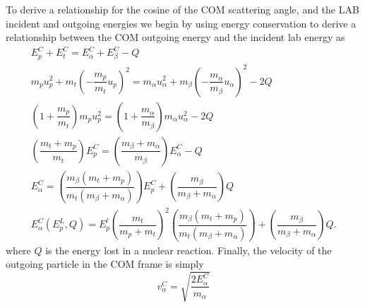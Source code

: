 \documentclass[../main.tex]{subfiles}
\begin{document}
To derive a relationship for the cosine of the COM scattering angle, and the LAB incident and outgoing energies we begin by using energy conservation to derive a relationship between the COM outgoing energy and the incident lab energy as
\begin{gather*}
  E_p^C + E_t^C = E_{\alpha}^C + E_{\beta}^C - Q \\
  m_p u_p^2 + m_t \left(-\dfrac{m_p}{m_t} u_p \right)^2 = m_{\alpha} u_{\alpha}^2 + m_{\beta} \left(-\dfrac{m_{\alpha}}{m_{\beta}} u_{\alpha}\right)^2 - 2 Q \\
  \left(1 + \dfrac{m_p}{m_t}\right) m_p u_p^2 = \left(1 + \dfrac{m_{\alpha}}{m_{\beta}}\right) m_{\alpha} u_{\alpha}^2 - 2Q \\
  \left(\dfrac{m_t + m_p}{m_t}\right) E_p^C = \left(\dfrac{m_{\beta} + m_{\alpha}}{m_{\beta}}\right) E_{\alpha}^C - Q \\
  E_{\alpha}^C = \left(\dfrac{m_{\beta}(m_t + m_p)}{m_t(m_{\beta}+m_{\alpha})}\right) E_p^C + \left(\dfrac{m_{\beta}}{m_{\beta}+m_{\alpha}}\right) Q \\
  \boxed{E_{\alpha}^C(E_p^L,Q) = E_p^l \left( \dfrac{m_t}{m_p+m_t} \right)^2 \left(\dfrac{m_{\beta}(m_t + m_p)}{m_t(m_{\beta}+m_{\alpha})}\right) + \left(\dfrac{m_{\beta}}{m_{\beta}+m_{\alpha}}\right) Q}.
\end{gather*}
where $Q$ is the energy lost in a nuclear reaction. Finally, the velocity of the outgoing particle in the COM frame is simply
\begin{equation}
  v_{\alpha}^C = \sqrt{\frac{2 E_{\alpha}^C}{m_{\alpha}}}
\end{equation}
\end{document}
